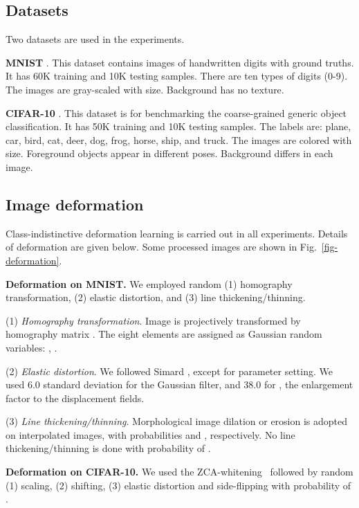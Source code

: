 \documentclass[10pt,twocolumn,letterpaper]{article}
\begin{document}
\subsection{Datasets}

Two datasets are used in the experiments.

{\bf MNIST} \cite{lecun-98h}. 
This dataset contains images of handwritten digits with ground truths.
It has 60K training and 10K testing samples.
There are ten types of digits (0-9).
The images are gray-scaled with  size.
Background has no texture.

{\bf CIFAR-10} \cite{KrizhevskyMasterThesis}.
This dataset is for benchmarking the 
coarse-grained generic object classification.
It has 50K training and 10K testing samples.
The labels are: plane, car, bird, cat, deer, dog, frog,
horse, ship, and truck.
The images are colored with  size.
Foreground objects appear in different poses.
Background differs in each image.

\subsection{Image deformation}

Class-indistinctive deformation learning is carried out in all experiments.
Details of deformation are given below.
Some processed images are shown in Fig.~\ref{fig-deformation}.

{\bf Deformation on MNIST.}
We employed random (1) homography transformation, (2) elastic distortion, and (3) line thickening/thinning.


\noindent
(1) {\it Homography transformation}.
Image is projectively transformed by homography matrix .
The eight elements are assigned as Gaussian random variables:
,
.

\noindent
(2) {\it Elastic distortion}.
We followed Simard \etal \cite{Simard03j.c.:best}, 
except for parameter setting.
We used 6.0 standard deviation for the Gaussian filter,
and 38.0 for , the enlargement factor to the displacement fields.


\noindent
(3) {\it Line thickening/thinning}.
Morphological image dilation or erosion is adopted on 
interpolated images, with probabilities  and ,
respectively.
No line thickening/thinning is done with probability of .

{\bf Deformation on CIFAR-10.}
We used the ZCA-whitening~\cite{KrizhevskyMasterThesis} 
followed by random (1) scaling, (2) shifting, (3) elastic distortion and side-flipping with probability of .
\end{document}

